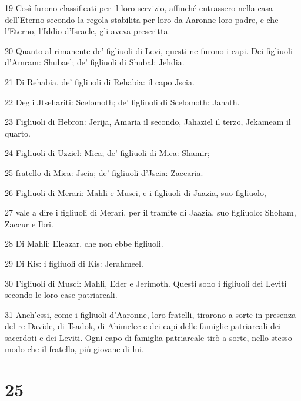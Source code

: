 \par 19 Così furono classificati per il loro servizio, affinché entrassero nella casa dell'Eterno secondo la regola stabilita per loro da Aaronne loro padre, e che l'Eterno, l'Iddio d'Israele, gli aveva prescritta.
\par 20 Quanto al rimanente de' figliuoli di Levi, questi ne furono i capi. Dei figliuoli d'Amram: Shubael; de' figliuoli di Shubal; Jehdia.
\par 21 Di Rehabia, de' figliuoli di Rehabia: il capo Jscia.
\par 22 Degli Jtsehariti: Scelomoth; de' figliuoli di Scelomoth: Jahath.
\par 23 Figliuoli di Hebron: Jerija, Amaria il secondo, Jahaziel il terzo, Jekameam il quarto.
\par 24 Figliuoli di Uzziel: Mica; de' figliuoli di Mica: Shamir;
\par 25 fratello di Mica: Jscia; de' figliuoli d'Jscia: Zaccaria.
\par 26 Figliuoli di Merari: Mahli e Musci, e i figliuoli di Jaazia, suo figliuolo,
\par 27 vale a dire i figliuoli di Merari, per il tramite di Jaazia, suo figliuolo: Shoham, Zaccur e Ibri.
\par 28 Di Mahli: Eleazar, che non ebbe figliuoli.
\par 29 Di Kis: i figliuoli di Kis: Jerahmeel.
\par 30 Figliuoli di Musci: Mahli, Eder e Jerimoth. Questi sono i figliuoli dei Leviti secondo le loro case patriarcali.
\par 31 Anch'essi, come i figliuoli d'Aaronne, loro fratelli, tirarono a sorte in presenza del re Davide, di Tsadok, di Ahimelec e dei capi delle famiglie patriarcali dei sacerdoti e dei Leviti. Ogni capo di famiglia patriarcale tirò a sorte, nello stesso modo che il fratello, più giovane di lui.

\chapter{25}

